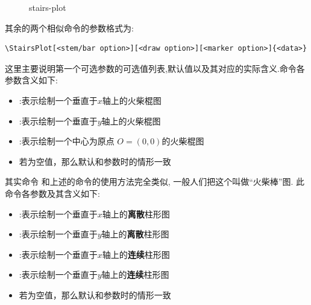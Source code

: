 \documentclass[
  hyper,    
  lang=cn,
  class=book,
  bib_index={load},
  mathSpec={envStyle=leftbar, alias},
  toc={column=2, title=目录},
]{zlatex}
\let\cmd\ztexverb
\begin{document}
\begin{figure}
    \centering
    \caption{stairs-plot}
    \label{fig:stairs-plot}
\end{figure}

其余的两个相似命令\cmd{\StemPlot, \BarPlot}的参数格式为:
\begin{verbatim}
\StairsPlot[<stem/bar option>][<draw option>][<marker option>]{<data>}
\end{verbatim}

这里主要说明第一个可选参数的可选值列表,默认值以及其对应的实际含义.\cmd{\StemPlot}命令各参数含义如下:
\begin{itemize}
    \item \cmd{x}:表示绘制一个垂直于$x$轴上的火柴棍图
    \item \cmd{y}:表示绘制一个垂直于$y$轴上的火柴棍图
    \item \cmd{o}:表示绘制一个中心为原点 $O=(0,0)$的火柴棍图
    \item 若为空值，那么默认和\cmd{x}参数时的情形一致
\end{itemize}

其实命令 \cmd{\BarPlot} 和上述的\cmd{\Stemplot}命令的使用方法完全类似, 一般人们把这个叫做``火柴棒''图.
此命令各参数及其含义如下:
\begin{itemize}
    \item \cmd{x}:表示绘制一个垂直于$x$轴上的{\bf 离散}柱形图
    \item \cmd{y}:表示绘制一个垂直于$y$轴上的{\bf 离散}柱形图
    \item \cmd{xc}:表示绘制一个垂直于$x$轴上的{\bf 连续}柱形图
    \item \cmd{yc}:表示绘制一个垂直于$y$轴上的{\bf 连续}柱形图
    \item 若为空值，那么默认和\cmd{x}参数时的情形一致
\end{itemize}
\end{document}
